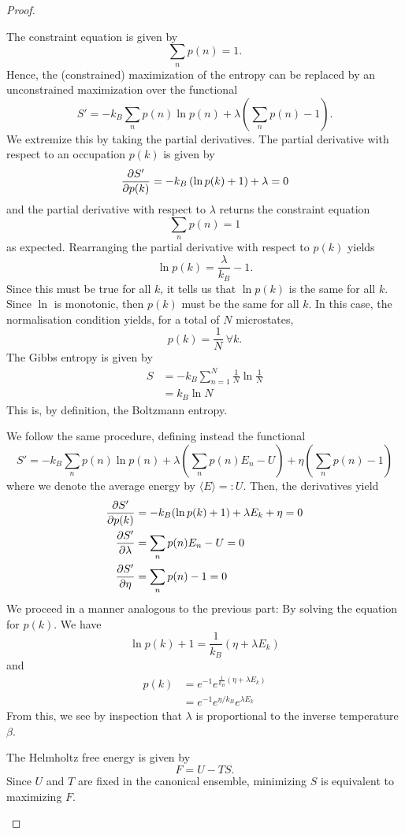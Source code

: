 \begin{proof}
	\begin{parts}
	\item The constraint equation is given by
		\[
			\sum_{n} p(n) = 1
		.\] 
		Hence, the (constrained) maximization of the entropy can be replaced by an unconstrained maximization over the functional
		\[
		S' = -k_B \sum_n p(n) \ln p(n) + \lambda\left( \sum_n p(n) - 1 \right) 
		.\] 
		We extremize this by taking the partial derivatives. The partial derivative with respect to an occupation $p(k)$ is given by
		\[
			\pdv{S'}{p(k)} = -k_B\left( \ln p(k) + 1 \right) + \lambda=0
		\] 
		and the partial derivative with respect to $\lambda$ returns the constraint equation
		\[
		\sum_n p(n) = 1
	\]
	as expected. Rearranging the partial derivative with respect to $p(k)$ yields
	\[
	\ln p(k) = \frac{\lambda}{k_B}-1
	.\] 
	Since this must be true for all $k$, it tells us that $\ln p(k)$ is the same for all $k$. Since $\ln$ is monotonic, then $p(k)$ must be the same for all $k$. In this case, the normalisation condition yields, for a total of $N$ microstates,
	\[
	p(k) = \frac{1}{N}~\forall k
.\]
The Gibbs entropy is given by
\begin{align*}
	S &= -k_B \sum_{n=1}^{N} \frac{1}{N}\ln \frac{1}{N}\\
	&= k_B \ln N
\end{align*}
This is, by definition, the Boltzmann entropy.
\item We follow the same procedure, defining instead the functional
	\[
	S' = -k_B \sum_n p(n) \ln p(n)+ \lambda\left( \sum_n p(n) E_n - U \right) +\eta\left( \sum_n p(n) - 1 \right) 
\]
where we denote the average energy by $\langle E \rangle =: U$. Then, the derivatives yield
\begin{align*}
	\pdv{S'}{p(k)} &= -k_B(\ln p(k)+1) + \lambda E_k +\eta=0 \\
	\pdv{S'}{\lambda} &= \sum_n p(n)E_n - U = 0 \\
	\pdv{S'}{\eta} &= \sum_n p(n) - 1 =0
\end{align*}
We proceed in a manner analogous to the previous part: By solving the equation for $p(k)$. We have
\[
\ln p(k) + 1 = \frac{1}{k_B}\left( \eta + \lambda E_k \right) 
\]
and
\begin{align*}
	p(k) &= e^{-1} e^{\frac{1}{k_B}(\eta + \lambda E_k)}\\
	     &= e^{-1}e^{\eta / k_B} e^{\lambda E_k} 
\end{align*}
From this, we see by inspection that $\lambda$ is proportional to the inverse temperature $\beta$.
\item The Helmholtz free energy is given by
	 \[
	F = U - TS
	.\] 
	Since $U$ and $T$ are fixed in the canonical ensemble, minimizing $S$ is equivalent to maximizing $F$.\qedhere
	\end{parts}
\end{proof}
